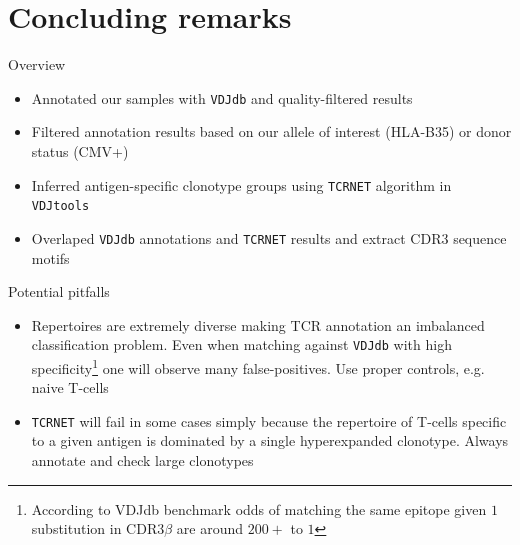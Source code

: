 \documentclass[12pt]{beamer}
\begin{document}
\section{Concluding remarks}

\begin{frame}{Overview}
\begin{itemize}
\item Annotated our samples with \texttt{VDJdb} and quality-filtered results
\item Filtered annotation results based on our allele of interest (HLA-B35) or donor status (CMV+)
\item Inferred antigen-specific clonotype groups using \texttt{TCRNET} algorithm in \texttt{VDJtools}
\item Overlaped \texttt{VDJdb} annotations and \texttt{TCRNET} results and extract CDR3 sequence motifs
\end{itemize}
\end{frame}

\begin{frame}{Potential pitfalls}
\begin{itemize}
\item Repertoires are extremely diverse making TCR annotation an imbalanced classification problem. Even when matching against \texttt{VDJdb} with high specificity\footnote{According to VDJdb benchmark odds of matching the same epitope given $1$ substitution in CDR3$\beta$ are around $200+$ to $1$} one will observe many false-positives.
\colorbox{yellow!50!white}{Use proper controls, e.g. naive T-cells}
\item \texttt{TCRNET} will fail in some cases simply because the repertoire of T-cells specific to a given antigen is dominated by a single hyperexpanded clonotype.
\colorbox{yellow!50!white}{Always annotate and check large clonotypes}
\end{itemize}
\end{frame}
\end{document}
